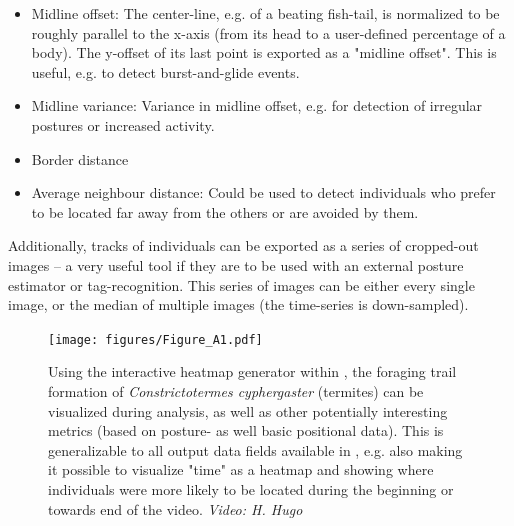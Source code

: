 \documentclass[9pt,lineno]{elife}
\newcommand{\TRex}{\protect\path{TRex}}
\begin{document}
\begin{appendixbox}
\begin{itemize}
\begin{itemize}
            \item Midline offset: The center-line, e.g. of a beating fish-tail, is normalized to be roughly parallel to the x-axis (from its head to a user-defined percentage of a body). The y-offset of its last point is exported as a "midline offset". This is useful, e.g. to detect burst-and-glide events.
            \item Midline variance: Variance in midline offset, e.g. for detection of irregular postures or increased activity.
            \item Border distance
            \item Average neighbour distance: Could be used to detect individuals who prefer to be located far away from the others or are avoided by them.
        \end{itemize}
\end{itemize}

Additionally, tracks of individuals can be exported as a series of cropped-out images -- a very useful tool if they are to be used with an external posture estimator or tag-recognition. This series of images can be either every single image, or the median of multiple images (the time-series is down-sampled).
\end{appendixbox}

\begin{figure}
\texttt{[image: figures/Figure\_A1.pdf]}
\caption{Using the interactive heatmap generator within \TRex{}, the foraging trail formation of \textit{Constrictotermes cyphergaster} (termites) can be visualized during analysis, as well as other potentially interesting metrics (based on posture- as well basic positional data). This is generalizable to all output data fields available in \TRex{}, e.g. also making it possible to visualize "time" as a heatmap and showing where individuals were more likely to be located during the beginning or towards end of the video. \textit{Video: H. Hugo}}
\label{fig:trex_screenshot_heatmaps}
\end{figure}
\end{document}
